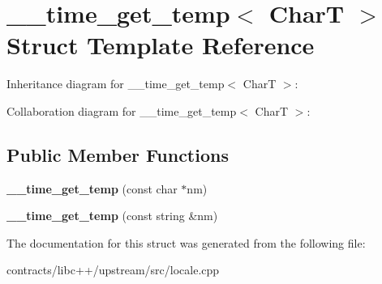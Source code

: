 \hypertarget{struct____time__get__temp}{}\section{\+\_\+\+\_\+time\+\_\+get\+\_\+temp$<$ CharT $>$ Struct Template Reference}
\label{struct____time__get__temp}


Inheritance diagram for \+\_\+\+\_\+time\+\_\+get\+\_\+temp$<$ CharT $>$\+:


Collaboration diagram for \+\_\+\+\_\+time\+\_\+get\+\_\+temp$<$ CharT $>$\+:
\subsection*{Public Member Functions}
\begin{DoxyCompactItemize}
\item 
\mbox{\label{struct____time__get__temp_abc2744acfcb6bdd328261d8a3d0b548d}} 
{\bfseries \+\_\+\+\_\+time\+\_\+get\+\_\+temp} (const char $\ast$nm)
\item 
\mbox{\label{struct____time__get__temp_acb06e36a2a9f6cdd63c067ffbe151187}} 
{\bfseries \+\_\+\+\_\+time\+\_\+get\+\_\+temp} (const string \&nm)
\end{DoxyCompactItemize}


The documentation for this struct was generated from the following file\+:\begin{DoxyCompactItemize}
\item 
contracts/libc++/upstream/src/locale.\+cpp\end{DoxyCompactItemize}
